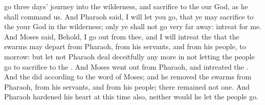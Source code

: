 {go
three
days’
journey into the
wilderness, and
sacrifice to the
{} our
God, as he shall
command us.
And
Pharaoh
said, I will let you
go, that ye may
sacrifice to the
{} your
God in the
wilderness; only ye shall not
go
very far
away:
intreat for
me.
And
Moses
said, Behold, I go
out from thee, and I will
intreat the
{} that the
swarms
{} may
depart from
Pharaoh, from his
servants, and from his
people, to
morrow:
but let not
Pharaoh deal
deceitfully any
more in
not letting the
people
go to
sacrifice to the
{}.
And
Moses went
out from
Pharaoh, and
intreated the
{}.
And the
{}
did according to the
word of
Moses; and he
removed the
swarms
{} from
Pharaoh, from his
servants, and from his
people; there
remained not
one.
And
Pharaoh
hardened his
heart at this
time also, neither would he let the
people
go.

}
